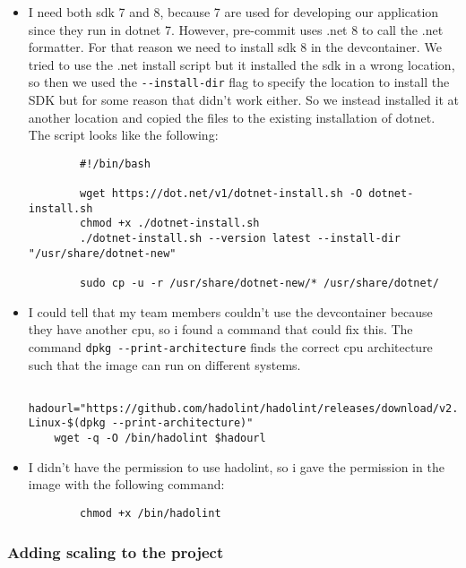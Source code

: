 \begin{itemize}
    \item I need both sdk 7 and 8, because 7 are used for developing our application since they run in dotnet 7. However, pre-commit uses .net 8 to call the .net formatter. For that reason we need to install sdk 8 in the devcontainer. We tried to use the .net install script but it installed the sdk in a wrong location, so then we used the \texttt{-\/-install-dir} flag to specify the location to install the SDK but for some reason that didn't work either. So we instead installed it at another location and copied the files to the existing installation of dotnet. The script looks like the following:

    \begin{verbatim}
        #!/bin/bash

        wget https://dot.net/v1/dotnet-install.sh -O dotnet-install.sh
        chmod +x ./dotnet-install.sh
        ./dotnet-install.sh --version latest --install-dir "/usr/share/dotnet-new"

        sudo cp -u -r /usr/share/dotnet-new/* /usr/share/dotnet/
    \end{verbatim}

    \item I could tell that my team members couldn't use the devcontainer because they have another cpu, so i found a command that could fix this. The command \texttt{dpkg\ -\/-print-architecture} finds the correct cpu architecture such that the image can run on different systems.
    \begin{verbatim}
    hadourl="https://github.com/hadolint/hadolint/releases/download/v2.10.0/hadolint-Linux-$(dpkg --print-architecture)"
    wget -q -O /bin/hadolint $hadourl
    \end{verbatim}

    \item I didn't have the permission to use hadolint, so i gave the permission in the image with the following command:
    \begin{verbatim}
        chmod +x /bin/hadolint
    \end{verbatim}
\end{itemize}

\subsubsection{Adding scaling to the project}
\label{log:adding-scaling-to-the-project}

